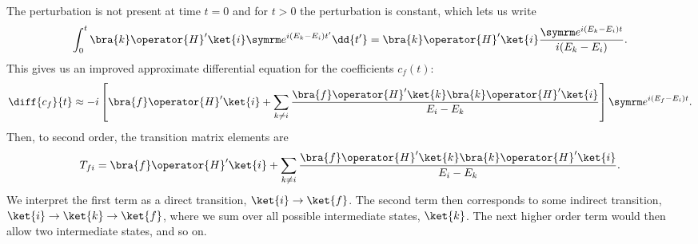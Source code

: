 The perturbation is not present at time \(t = 0\) and for \(t > 0\) the perturbation is constant, which lets us write
\begin{equation}
    \int_0^t \bra{k} \operator{H}' \ket{i} \e^{i(E_k - E_i)t'} \dd{t'} = \bra{k} \operator{H}'\ket{i} \frac{\e^{i(E_k-E_i)t}}{i(E_k - E_i)}.
\end{equation}
This gives us an improved approximate differential equation for the coefficients \(c_f(t)\):
\begin{equation}
    \diff{c_f}{t} \approx -i \left[ \bra{f} \operator{H}' \ket{i} + \sum_{k \ne i} \frac{\bra{f} \operator{H}' \ket{k} \bra{k} \operator{H}' \ket{i}}{E_i - E_k} \right] \e^{i(E_f - E_i)t}.
\end{equation}
Then, to second order, the transition matrix elements are
\begin{equation}
    T_{fi} = \bra{f} \operator{H}' \ket{i} + \sum_{k \ne i} \frac{\bra{f} \operator{H}' \ket{k} \bra{k} \operator{H}' \ket{i}}{E_i - E_k}.
\end{equation}
We interpret the first term as a direct transition, \(\ket{i} \to \ket{f}\).
The second term then corresponds to some indirect transition, \(\ket{i} \to \ket{k} \to \ket{f}\), where we sum over all possible intermediate states, \(\ket{k}\).
The next higher order term would then allow two intermediate states, and so on.